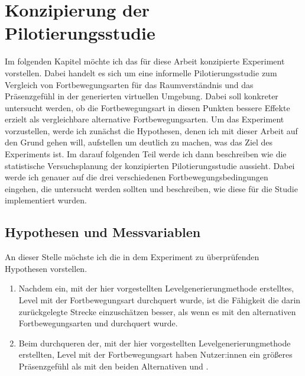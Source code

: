 \chapter{Konzipierung der Pilotierungsstudie}\label{chapter:experiment}
    Im folgenden Kapitel möchte ich das für diese Arbeit konzipierte Experiment vorstellen. Dabei handelt es sich um eine informelle Pilotierungsstudie zum Vergleich von Fortbewegungsarten für das Raumverständnis und das Präsenzgefühl in der generierten virtuellen Umgebung. Dabei soll konkreter untersucht werden, ob die Fortbewegungsart  in diesen Punkten bessere Effekte erzielt als vergleichbare alternative Fortbewegungsarten.
    Um das Experiment vorzustellen, werde ich zunächst die Hypothesen, denen ich mit dieser Arbeit auf den Grund gehen will, aufstellen um deutlich zu machen, was das Ziel des Experiments ist.
    Im darauf folgenden Teil werde ich dann beschreiben wie die statistische Versuchsplanung der konzipierten Pilotierungsstudie aussieht. Dabei werde ich genauer auf die drei verschiedenen Fortbewegungsbedingungen eingehen, die untersucht werden sollten und beschreiben, wie diese für die Studie implementiert wurden.

    \section{Hypothesen und Messvariablen}
        An dieser Stelle möchste ich die in dem Experiment zu überprüfenden Hypothesen vorstellen.

        \begin{enumerate}
            \item Nachdem ein, mit der hier vorgestellten Levelgenerierungmethode erstelltes, Level mit der Fortbewegungsart  durchquert wurde, ist die Fähigkeit die darin zurückgelegte Strecke einzuschätzen besser, als wenn es mit den alternativen Fortbewegungsarten  und  durchquert wurde.

            \item Beim durchqueren der, mit der hier vorgestellten Levelgenerierungmethode erstellten, Level mit der  Fortbewegungsart haben Nutzer:innen ein größeres Präsenzgefühl als mit den beiden Alternativen  und .
        \end{enumerate}

